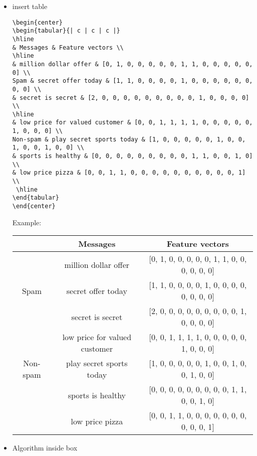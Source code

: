 \documentclass[twoside,12pt]{article}
\begin{document}
\begin{itemize}
\begin{lstlisting}
\end{lstlisting}
\item insert table \\
\begin{lstlisting}
\begin{center}
\begin{tabular}{| c | c | c |}
\hline
& Messages & Feature vectors \\
\hline
& million dollar offer & [0, 1, 0, 0, 0, 0, 0, 1, 1, 0, 0, 0, 0, 0, 0] \\
Spam & secret offer today & [1, 1, 0, 0, 0, 0, 1, 0, 0, 0, 0, 0, 0, 0, 0] \\
& secret is secret & [2, 0, 0, 0, 0, 0, 0, 0, 0, 0, 1, 0, 0, 0, 0] \\
\hline
& low price for valued customer & [0, 0, 1, 1, 1, 1, 0, 0, 0, 0, 0, 1, 0, 0, 0] \\
Non-spam & play secret sports today & [1, 0, 0, 0, 0, 0, 1, 0, 0, 1, 0, 0, 1, 0, 0] \\
& sports is healthy & [0, 0, 0, 0, 0, 0, 0, 0, 0, 1, 1, 0, 0, 1, 0] \\
& low price pizza & [0, 0, 1, 1, 0, 0, 0, 0, 0, 0, 0, 0, 0, 0, 1] \\
 \hline
\end{tabular}
\end{center}
\end{lstlisting}
Example: 
\begin{center}
\begin{tabular}{| c | c | c |}
\hline
& Messages & Feature vectors \\
\hline
& million dollar offer & [0, 1, 0, 0, 0, 0, 0, 1, 1, 0, 0, 0, 0, 0, 0] \\
Spam & secret offer today & [1, 1, 0, 0, 0, 0, 1, 0, 0, 0, 0, 0, 0, 0, 0] \\
& secret is secret & [2, 0, 0, 0, 0, 0, 0, 0, 0, 0, 1, 0, 0, 0, 0] \\
\hline
& low price for valued customer & [0, 0, 1, 1, 1, 1, 0, 0, 0, 0, 0, 1, 0, 0, 0] \\
Non-spam & play secret sports today & [1, 0, 0, 0, 0, 0, 1, 0, 0, 1, 0, 0, 1, 0, 0] \\
& sports is healthy & [0, 0, 0, 0, 0, 0, 0, 0, 0, 1, 1, 0, 0, 1, 0] \\
& low price pizza & [0, 0, 1, 1, 0, 0, 0, 0, 0, 0, 0, 0, 0, 0, 1] \\
 \hline
\end{tabular}
\end{center}
\item Algorithm inside box

\end{itemize}
\end{document}
